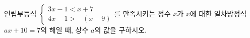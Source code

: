 연립부등식 $\begin{cases} 3x-1<x+7 \\ 4x-1>-(x-9) \end{cases}$를 만족시키는 정수 $x$가 $x$에 대한 일차방정식 $ax+10=7$의 해일 때, 상수 $a$의 값을 구하시오.
